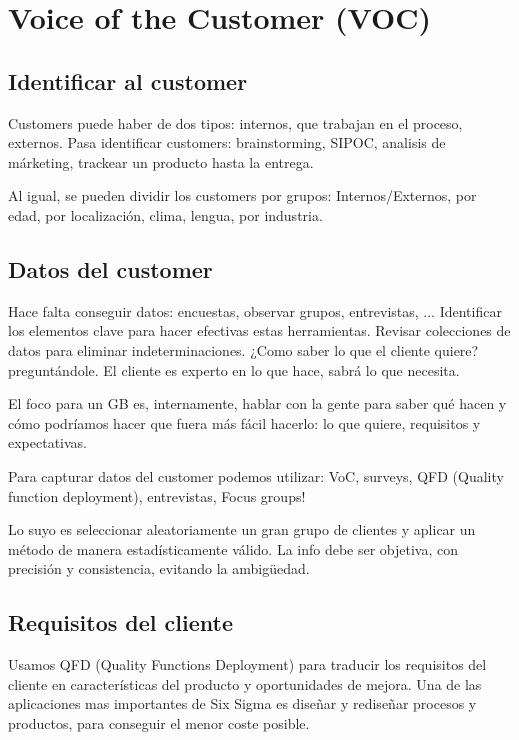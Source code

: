 \documentclass[]{article}
\begin{document}
\section{Voice of the Customer (VOC)}

\subsection{Identificar al customer}
Customers puede haber de dos tipos: internos, que trabajan en el proceso, externos. Pasa identificar customers: brainstorming, SIPOC, analisis de márketing, trackear un producto hasta la entrega.

Al igual, se pueden dividir los customers por grupos: Internos/Externos, por edad, por localización, clima, lengua, por industria.

\subsection{Datos del customer}

Hace falta conseguir datos: encuestas, observar grupos, entrevistas, ... Identificar los elementos clave para hacer efectivas estas herramientas. Revisar colecciones de datos para eliminar indeterminaciones.
¿Como saber lo que el cliente quiere? preguntándole. El cliente es experto en lo que hace, sabrá lo que necesita. 

El foco para un GB es, internamente, hablar con la gente para saber qué hacen y cómo podríamos hacer que fuera más fácil hacerlo: lo que quiere, requisitos y expectativas. 

Para capturar datos del customer podemos utilizar: VoC, surveys, QFD (Quality function deployment), entrevistas, Focus groups!

Lo suyo es seleccionar aleatoriamente un gran grupo de clientes y aplicar un método de manera estadísticamente válido. La info debe ser objetiva, con precisión y consistencia, evitando la ambigüedad. 

\subsection{Requisitos del cliente}

Usamos QFD (Quality Functions Deployment) para traducir los requisitos del cliente en características del producto y oportunidades de mejora. Una de las aplicaciones mas importantes de Six Sigma es diseñar y rediseñar procesos y productos, para conseguir el menor coste posible.
\end{document}
